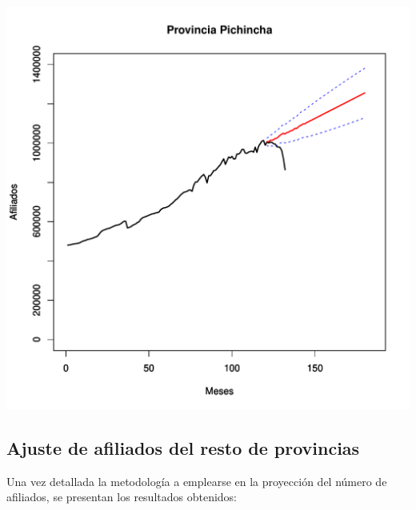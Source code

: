 \documentclass[11pt,a4paper,oneside]{article}\usepackage[]{graphicx}\usepackage[]{color}
\makeatletter
\def\maxwidth{ %
  \ifdim\Gin@nat@width>\linewidth
    \linewidth
  \else
    \Gin@nat@width
  \fi
}
\newenvironment{knitrout}{}{} %
\makeatother
\begin{document}
\begin{knitrout}
\color{fgcolor}
\includegraphics[width=\maxwidth]{figure/unnamed-chunk-15-1} 

\end{knitrout}

\subsection{Ajuste de afiliados del resto de provincias}

Una vez detallada la metodología a emplearse en la proyección del número de afiliados, se presentan los resultados obtenidos:
\end{document}
